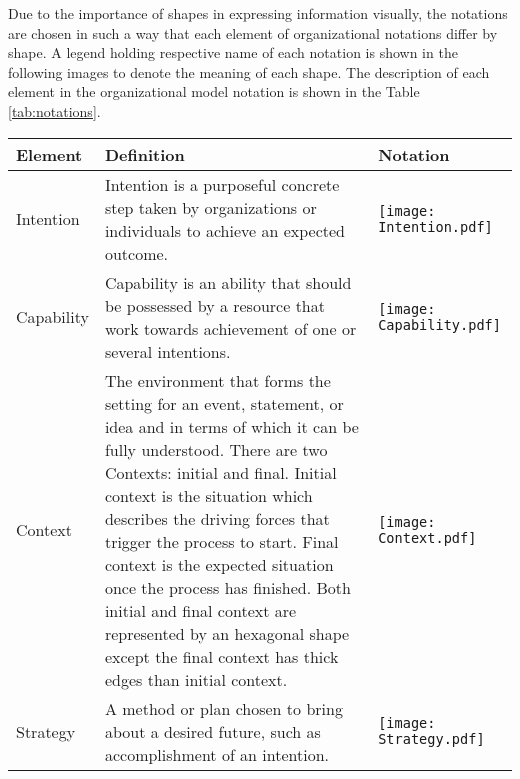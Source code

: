 Due to the importance of shapes in expressing information visually, the notations are chosen in such a way that each element of organizational notations differ by shape. A legend holding respective name of each notation is shown in the following images to denote the meaning of each shape. The description of each element in the organizational model notation is shown in the Table \ref{tab:notations}. 

\begin{center}
	\begin{longtable}{p{3cm}p{10cm}p{3cm}}
		\toprule 
		\textbf{Element} & \textbf{Definition} & \textbf{Notation} \\
		\midrule
		\endfirsthead
		Intention 			& Intention is a purposeful concrete step taken by organizations or individuals to achieve an expected outcome. & \begin{center} \texttt{[image: Intention.pdf]}  \end{center}  \\
		
		Capability	&  Capability is an ability that should be possessed by a resource that work towards achievement of one or several intentions.   & \begin{center} \texttt{[image: Capability.pdf]} \end{center}  \\
		
		Context				& The environment that forms the setting for an event, statement, or idea and in terms of which it can be fully understood. There are two Contexts: initial and final. Initial context is the situation which describes the driving forces that trigger the process to start. Final context is the expected situation once the process has finished. Both initial and final context are represented by an hexagonal shape except the final context has thick edges than initial context.  & \begin{center} \texttt{[image: Context.pdf]} \end{center}   \\
		\newline
		Strategy		& \newline  A method or plan chosen to bring about a desired future, such as accomplishment of an intention.   & \begin{center} \texttt{[image: Strategy.pdf]} \end{center}  \\
		

\end{longtable}
\end{center}
